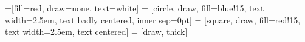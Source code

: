 \usetikzlibrary{automata,shapes,arrows,decorations.pathmorphing}
=[fill=red, draw=none, text=white]
 = [circle, draw, fill=blue!15, text width=2.5em, text badly centered, inner sep=0pt]
 = [square, draw, fill=red!15, text width=2.5em, text centered]
 = [draw, thick]